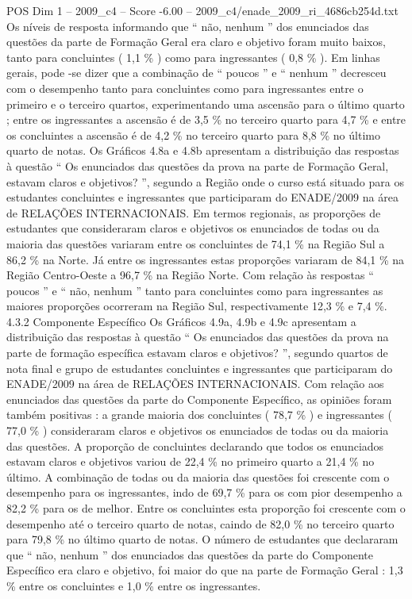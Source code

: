\begin{textsample}{POS Dim 1 – 2009\_c4 – Score -6.00 – 2009\_c4/enade\_2009\_ri\_4686cb254d.txt}
Os níveis de resposta informando que “ não, nenhum ” dos enunciados das questões da parte de Formação Geral era claro e objetivo foram muito baixos, tanto para concluintes ( 1,1 \% ) como para ingressantes ( 0,8 \% ).
Em linhas gerais, pode -se dizer que a combinação de “ poucos ” e “ nenhum ” decresceu com o desempenho tanto para concluintes como para ingressantes entre o primeiro e o terceiro quartos, experimentando uma ascensão para o último quarto ; entre os ingressantes a ascensão é de 3,5 \% no terceiro quarto para 4,7 \% e entre os concluintes a ascensão é de 4,2 \% no terceiro quarto para 8,8 \% no último quarto de notas.
Os Gráficos 4.8a e 4.8b apresentam a distribuição das respostas à questão “ Os enunciados das questões da prova na parte de Formação Geral, estavam claros e objetivos? ”, segundo a Região onde o curso está situado para os estudantes concluintes e ingressantes que participaram do ENADE/2009 na área de RELAÇÕES INTERNACIONAIS.
Em termos regionais, as proporções de estudantes que consideraram claros e objetivos os enunciados de todas ou da maioria das questões variaram entre os concluintes de 74,1 \% na Região Sul a 86,2 \% na Norte.
Já entre os ingressantes estas proporções variaram de 84,1 \% na Região Centro-Oeste a 96,7 \% na Região Norte.
Com relação às respostas “ poucos ” e “ não, nenhum ” tanto para concluintes como para ingressantes as maiores proporções ocorreram na Região Sul, respectivamente 12,3 \% e 7,4 \%. 4.3.2 Componente Específico Os Gráficos 4.9a, 4.9b e 4.9c apresentam a distribuição das respostas à questão “ Os enunciados das questões da prova na parte de formação específica estavam claros e objetivos? ”, segundo quartos de nota final e grupo de estudantes concluintes e ingressantes que participaram do ENADE/2009 na área de RELAÇÕES INTERNACIONAIS.
Com relação aos enunciados das questões da parte do Componente Específico, as opiniões foram também positivas : a grande maioria dos concluintes ( 78,7 \% ) e ingressantes ( 77,0 \% ) consideraram claros e objetivos os enunciados de todas ou da maioria das questões.
A proporção de concluintes declarando que todos os enunciados estavam claros e objetivos variou de 22,4 \% no primeiro quarto a 21,4 \% no último.
A combinação de todas ou da maioria das questões foi crescente com o desempenho para os ingressantes, indo de 69,7 \% para os com pior desempenho a 82,2 \% para os de melhor.
Entre os concluintes esta proporção foi crescente com o desempenho até o terceiro quarto de notas, caindo de 82,0 \% no terceiro quarto para 79,8 \% no último quarto de notas.
O número de estudantes que declararam que “ não, nenhum ” dos enunciados das questões da parte do Componente Específico era claro e objetivo, foi maior do que na parte de Formação Geral : 1,3 \% entre os concluintes e 1,0 \% entre os ingressantes.

\end{textsample}
